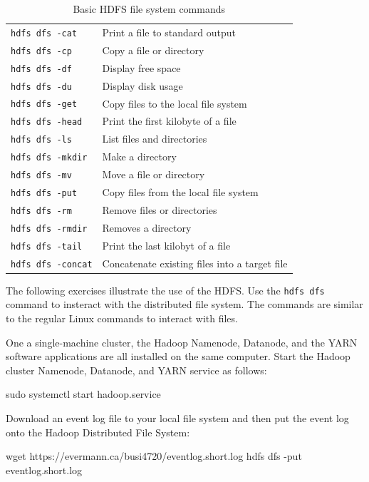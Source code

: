 \begin{withcode}
\begin{table}
\renewcommand{\arraystretch}{1.25}
\small
\begin{tabular}{l|l} \hline
\texttt{hdfs dfs -cat} & Print a file to standard output \\
\texttt{hdfs dfs -cp} & Copy a file or directory\\
\texttt{hdfs dfs -df} & Display free space \\
\texttt{hdfs dfs -du} & Display disk usage \\
\texttt{hdfs dfs -get} & Copy files to the local file system \\
\texttt{hdfs dfs -head} & Print the first kilobyte of a file \\
\texttt{hdfs dfs -ls} & List files and directories \\
\texttt{hdfs dfs -mkdir} & Make a directory \\
\texttt{hdfs dfs -mv} & Move a file or directory \\
\texttt{hdfs dfs -put} & Copy files from the local file system \\
\texttt{hdfs dfs -rm} & Remove files or directories \\
\texttt{hdfs dfs -rmdir} & Removes a directory \\
\texttt{hdfs dfs -tail} & Print the last kilobyt of a file \\
\texttt{hdfs dfs -concat} & Concatenate existing files into a target file \\ \hline
\end{tabular}
\caption{Basic HDFS file system commands}
\label{tab:hdfscommands}
\end{table}

The following exercises illustrate the use of the HDFS. Use the \texttt{hdfs dfs} command to insteract with the distributed file system. The commands are similar to the regular Linux commands to interact with files.

One a single-machine cluster, the Hadoop Namenode, Datanode, and the YARN software applications are all installed on the same computer. Start the Hadoop cluster Namenode, Datanode, and YARN service as follows:

\begin{bashcode}
sudo systemctl start hadoop.service
\end{bashcode}

Download an event log file to your local file system and then put the event log onto the Hadoop Distributed File System:

\begin{bashcode}
wget https://evermann.ca/busi4720/eventlog.short.log
hdfs dfs -put eventlog.short.log
\end{bashcode}


\end{withcode}
